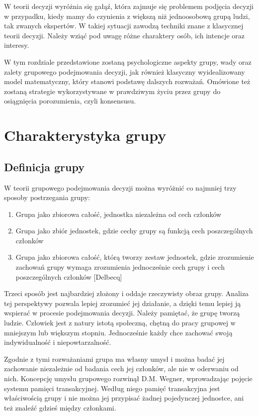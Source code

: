 W teorii decyzji wyróżnia się gałąź, która zajmuje się problemem podjęcia decyzji 
w przypadku, kiedy mamy do czynienia z większą niż jednoosobową grupą ludzi, tak 
zwanych ekspertów. W takiej sytuacji zawodzą techniki znane  z klasycznej 
teorii decyzji. Należy wziąć pod uwagę różne charaktery osób, ich intencje oraz
interesy.

W tym rozdziale przedstawione zostaną psychologiczne aspekty grupy, wady oraz 
zalety grupowego podejmowania decyzji, jak również klasyczny wyidealizowany 
model matematyczny, który stanowi podstawę dalszych rozważań. Omówione też 
zostaną strategie wykorzystywane w prawdziwym życiu przez grupy do osiągnięcia 
porozumienia, czyli konsensusu.

\section{Charakterystyka grupy}

\subsection{Definicja grupy}
W teorii grupowego podejmowania decyzji można wyróżnić co najmniej trzy sposoby 
postrzegania grupy:
\begin{enumerate}[1)]

\item Grupa jako zbiorowa całość, jednostka niezależna od cech członków

\item Grupa jako zbiór jednostek, gdzie cechy grupy są funkcją cech poszczególnych członków

\item Grupa jako zbiorowa całość, którą tworzy zestaw jednostek, gdzie zrozumienie 
zachowań grupy wymaga zrozumienia jednocześnie cech grupy i cech poszczególnych
członków [Delbecq]

\end{enumerate}
Trzeci sposób jest najbardziej złożony i oddaje rzeczywisty obraz grupy. Analiza tej 
perspektywy pozwala lepiej zrozumieć jej działanie, a dzięki temu lepiej ją wspierać 
w procesie podejmowania decyzji. Należy pamiętać, że grupę tworzą ludzie. Człowiek jest 
z natury istotą społeczną, chętną do pracy grupowej w mniejszym lub większym stopniu. 
Jednocześnie każdy chce zachować swoją indywidualność i niepowtarzalność. 

Zgodnie z tymi rozważaniami grupa ma własny umysł i można badać jej zachowanie niezależnie 
od badania cech jej członków, ale nie w oderwaniu od nich. Koncepcję umysłu grupowego rozwinął 
D.M. Wegner, wprowadzając pojęcie systemu pamięci transakcyjnej. Według niego pamięć transakcyjna 
jest właściwością grupy i nie można jej przypisać  żadnej pojedynczej jednostce, ani też znaleźć 
gdzieś między członkami.

